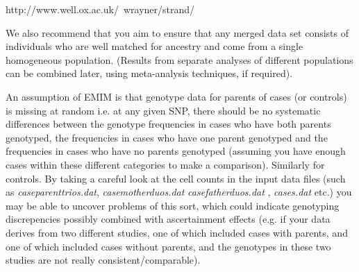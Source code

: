 \documentclass[a4paper,12pt]{article}
\begin{document}
http://www.well.ox.ac.uk/~wrayner/strand/

We also recommend that you aim to ensure that any merged data set consists of individuals who are well matched for ancestry and come from a single homogeneous population. (Results from separate analyses of different populations can be combined later, using meta-analysis techniques, if required). 

An assumption of EMIM is that genotype data for parents of cases (or controls) is missing at random i.e. at any given SNP, there should be no systematic differences between the genotype frequencies in cases who have both parents genotyped, the frequencies in cases who have one parent genotyped and the frequencies in cases who have no parents genotyped (assuming you have enough cases within these different categories to make a comparison). Similarly for controls. By taking a careful look at the cell counts in the input data files (such as {\it caseparenttrios.dat}, {\it casemotherduos.dat} {\it casefatherduos.dat} , {\it cases.dat} etc.) you may be able to uncover problems of this sort, which could indicate genotyping discrepencies possibly combined with ascertainment effects (e.g. if your data derives from two different studies, one of which included cases with parents, and one of which included cases without parents, and the genotypes in these two studies are not really consistent/comparable). 






\end{document}
